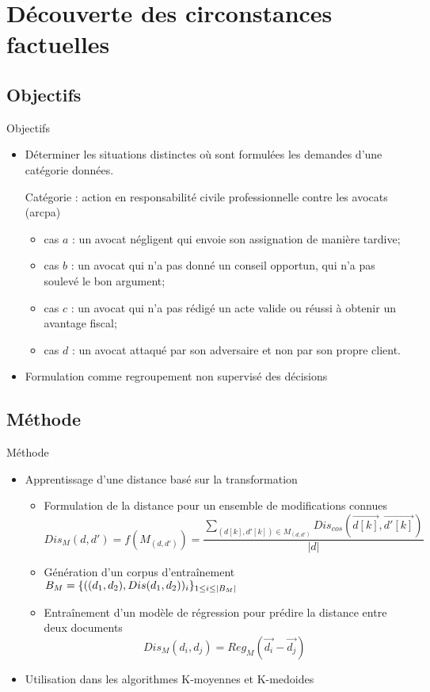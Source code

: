 \section{Découverte des circonstances factuelles}
\subsection{Objectifs}
\begin{frame}[c]{Objectifs}
	
	\begin{itemize} \small
		\item Déterminer les situations distinctes où sont formulées les demandes d'une catégorie données.
		\begin{exampleblock}{Catégorie : action en responsabilité civile professionnelle contre les avocats (arcpa)}\small
			\begin{itemize}
				\item cas $a$ : un avocat négligent qui envoie son assignation de manière tardive; 
				\item cas $b$ : un avocat qui n'a pas donné un conseil opportun, qui n'a pas soulevé le bon argument;
				\item cas $c$ : un avocat qui n'a pas rédigé un acte valide ou réussi à obtenir un avantage fiscal; 
				\item cas $d$ : un avocat attaqué par son adversaire et non par son propre client.
			\end{itemize}
		\end{exampleblock}
		\item Formulation comme regroupement non supervisé des décisions
	\end{itemize}
\end{frame}
\subsection{Méthode}
\begin{frame}[c]{Méthode}
	\begin{itemize}
		\item Apprentissage d'une distance basé sur la transformation
	\begin{itemize} 
		\item Formulation de la distance pour un ensemble de modifications connues	
		\[{Dis_{M}}(d,d') = {f}({M}_{(d,d')}) = \frac{\sum\limits_{(d[k], d'[k]) \in {M}_{(d,d')}} Dis_{cos}(\overrightarrow{d[k]}, \overrightarrow{d'[k]})}{\vert d \vert}\] 
		\item Génération d'un corpus d'entraînement	$B_{M} = \lbrace ((d_1, d_2), {Dis}(d_1, d_2))_i\rbrace_{1 \leq i \leq {\vert B_{M}\vert}}$
		\item Entraînement d'un modèle de régression pour prédire la distance entre deux documents \[Dis_{M}(d_i, d_j) = Reg_{M}(\vec{d_{i}} - \vec{d_{j}})\]
	\end{itemize}
	\item Utilisation dans les algorithmes K-moyennes et K-medoides				
	\end{itemize}	
\end{frame}

